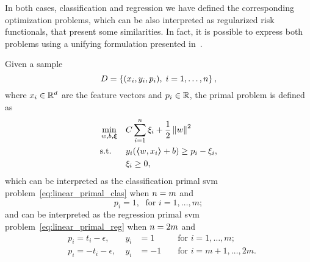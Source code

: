 In both cases, classification and regression we have defined the corresponding optimization problems, which can be also interpreted as regularized risk functionals, that present some similarities. In fact, it is possible to express both problems using a unifying formulation presented in~\cite{Lin01}.
\begin{definition}
    Given a sample
    $$ D = \left\{(x_i, y_i, p_i), \; i=1, \ldots, n\right\} ,$$
    where $x_i \in \mathbb{R}^d$ are the feature vectors and $p_i \in \mathbb{R}$, 
    the primal problem is defined as
    \begin{equation}
        \label{eq:linear_primal}
        \begin{aligned}
            &\min_{w, b, \fv{\xi}} & & C \sum_{i=1}^\nsamples \xi_i + \frac{1}{2} \norm{w}^2 \\
            & \text{s.t.} & & y_i (\dotp{w}{x_i} + b) \geq p_i - \xi_i , \\
            & & & \xi_i \geq 0 ,      
        \end{aligned}  
    \end{equation}
    which can be interpreted as the classification primal \acrshort{svm} problem~\eqref{eq:linear_primal_clas} when $n=m$ and
    $$ p_i = 1,\; \text{ for } i=1, \ldots, m ;$$
    and can be interpreted as the regression primal \acrshort{svm} problem~\eqref{eq:linear_primal_reg} when $n = 2 m$ and
    \begin{equation}
        \nonumber
        \begin{aligned}
            & p_i = t_i - \epsilon ,\; &y_i &= 1 &&\text{ for } i=1, \ldots, m ; \\
            & p_i = -t_i - \epsilon ,\; &y_i &= -1 &&\text{ for } i=m+1, \ldots, 2m .
        \end{aligned}
    \end{equation}
\end{definition}
%
